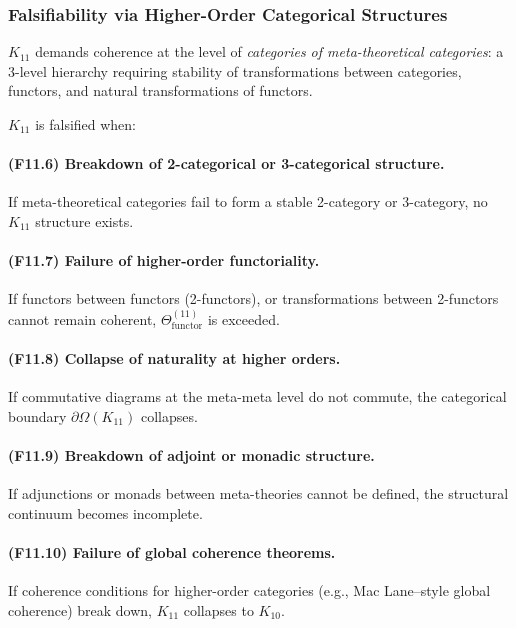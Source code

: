 \subsubsection{Falsifiability via Higher-Order Categorical Structures}

$K_{11}$ demands coherence at the level of
\emph{categories of meta-theoretical categories}:
a 3-level hierarchy requiring stability of transformations between
categories, functors, and natural transformations of functors.

$K_{11}$ is falsified when:

\paragraph{(F11.6) Breakdown of 2-categorical or 3-categorical structure.}
If meta-theoretical categories fail to form
a stable 2-category or 3-category, no $K_{11}$ structure exists.

\paragraph{(F11.7) Failure of higher-order functoriality.}
If functors between functors (2-functors), or
transformations between 2-functors cannot remain coherent,
$\Theta_{\mathrm{functor}}^{(11)}$ is exceeded.

\paragraph{(F11.8) Collapse of naturality at higher orders.}
If commutative diagrams at the meta-meta level do not commute,
the categorical boundary $\partial\Omega(K_{11})$ collapses.

\paragraph{(F11.9) Breakdown of adjoint or monadic structure.}
If adjunctions or monads between meta-theories cannot be defined,
the structural continuum becomes incomplete.

\paragraph{(F11.10) Failure of global coherence theorems.}
If coherence conditions for higher-order categories
(e.g., Mac Lane–style global coherence)
break down, $K_{11}$ collapses to $K_{10}$.



